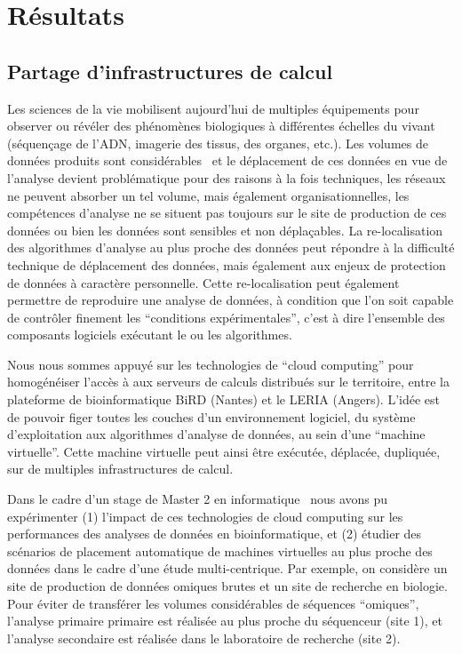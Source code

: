 \documentclass[a4paper,10pt]{article}
\theoremstyle{definition}
\begin{document}
\section{Résultats}
\subsection{Partage d'infrastructures de calcul}
Les sciences de la vie mobilisent aujourd'hui de multiples équipements pour observer ou révéler des phénomènes biologiques à différentes échelles du vivant (séquençage de l'ADN, imagerie des tissus, des organes, etc.). Les volumes de données produits sont considérables~\cite{bigdata} et le déplacement de ces données en vue de l'analyse devient problématique pour des raisons à la fois techniques, les réseaux ne peuvent absorber un tel volume, mais également organisationnelles, les compétences d'analyse ne se situent pas toujours sur le site de production de ces données ou bien les données sont sensibles et non déplaçables. La re-localisation des algorithmes d'analyse au plus proche des données peut répondre à la difficulté technique de déplacement des données, mais également aux enjeux de protection de données à caractère personnelle. Cette re-localisation peut également permettre de reproduire une analyse de données, à condition que l'on soit capable de contrôler finement les ``conditions expérimentales'', c'est à dire l'ensemble des composants logiciels exécutant le ou les algorithmes. 

Nous nous sommes appuyé sur les technologies de ``cloud computing'' pour homogénéiser l'accès à aux serveurs de calculs distribués sur le territoire, entre la plateforme de bioinformatique BiRD (Nantes) et le LERIA (Angers). L'idée est de pouvoir figer toutes les couches d'un environnement logiciel, du système d'exploitation aux algorithmes d'analyse de données, au sein d'une ``machine virtuelle''. Cette machine virtuelle peut ainsi être exécutée, déplacée, dupliquée, sur de multiples infrastructures de calcul. 

Dans le cadre d'un stage de Master 2 en informatique~\cite{refPatient} nous avons pu expé\-ri\-men\-ter (1) l'impact de ces technologies de cloud computing sur les performances des analyses de données en bioinformatique, et (2) étudier des scénarios de placement automatique de machines virtuelles au plus proche des données dans le cadre d'une étude multi-centrique. Par exemple, on considère un site de production de données omiques brutes et un site de recherche en biologie. Pour éviter de transférer les volumes considérables de séquences ``omiques'', l'analyse primaire primaire est réalisée au plus proche du séquenceur (site 1), et l'analyse secondaire est réalisée dans le laboratoire de recherche (site 2).
\end{document}
